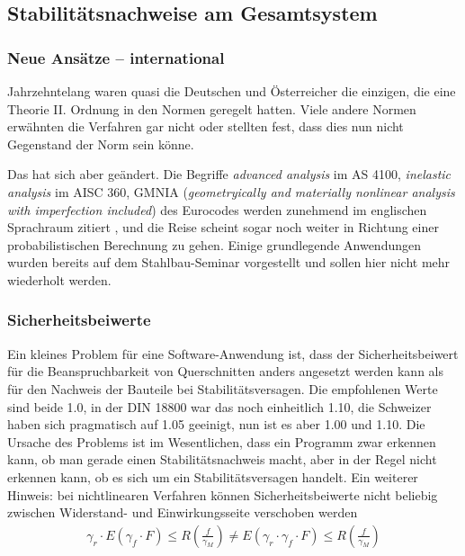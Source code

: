 {\textcolor{sectionTitleBlue}{\subsection{Stabilit\"{a}tsnachweise am Gesamtsystem }}}
\vspace{-0.2cm}
{\textcolor{sectionTitleBlue}{\subsubsection*{Neue Ans\"{a}tze -- international }}}

Jahrzehntelang waren quasi die Deutschen und \"{O}sterreicher die einzigen, die eine Theorie II. Ordnung in den Normen geregelt hatten. Viele andere Normen erw\"{a}hnten die Verfahren gar nicht oder stellten fest, dass dies nun nicht Gegenstand der Norm sein k\"{o}nne.

Das hat sich aber ge\"{a}ndert. Die Begriffe {\em advanced analysis\/} im AS 4100, {\em inelastic analysis\/} im AISC 360, GMNIA ({\em geometryically and materially nonlinear analysis with imperfection included\/}) des Eurocodes werden zunehmend im englischen Sprachraum zitiert \cite{Chen}, \cite{Rasmussen} und die Reise scheint sogar noch weiter in Richtung einer probabilistischen Berechnung zu gehen.
Einige grundlegende Anwendungen wurden bereits auf dem Stahlbau-Seminar \cite{Katz8} vorgestellt und sollen hier nicht mehr wiederholt werden.

{\textcolor{sectionTitleBlue}{\subsubsection*{Sicherheitsbeiwerte }}}

Ein kleines Problem f\"{u}r eine Software-Anwendung ist, dass der Sicherheitsbeiwert f\"{u}r die Beanspruchbarkeit von Querschnitten anders angesetzt werden kann als f\"{u}r den Nachweis der Bauteile bei Stabilit\"{a}tsversagen. Die empfohlenen Werte sind beide 1.0, in der DIN 18800 war das noch einheitlich 1.10, die Schweizer haben sich pragmatisch auf 1.05 geeinigt, nun ist es aber 1.00 und 1.10. Die Ursache des Problems ist im Wesentlichen, dass ein Programm zwar erkennen kann, ob man gerade einen Stabilit\"{a}tsnachweis macht, aber in der Regel nicht erkennen kann, ob es sich um ein Stabilit\"{a}tsversagen handelt. Ein weiterer Hinweis: bei nichtlinearen Verfahren k\"{o}nnen Sicherheitsbeiwerte nicht beliebig zwischen Widerstand- und Einwirkungsseite verschoben werden
\begin{align}
\gamma_r \cdot E(\gamma_f \cdot F) \leq R(\frac{f}{\gamma_M}) \neq E(\gamma_r \cdot \gamma_f \cdot F) \leq R (\frac{f}{\gamma_M})
\end{align}

